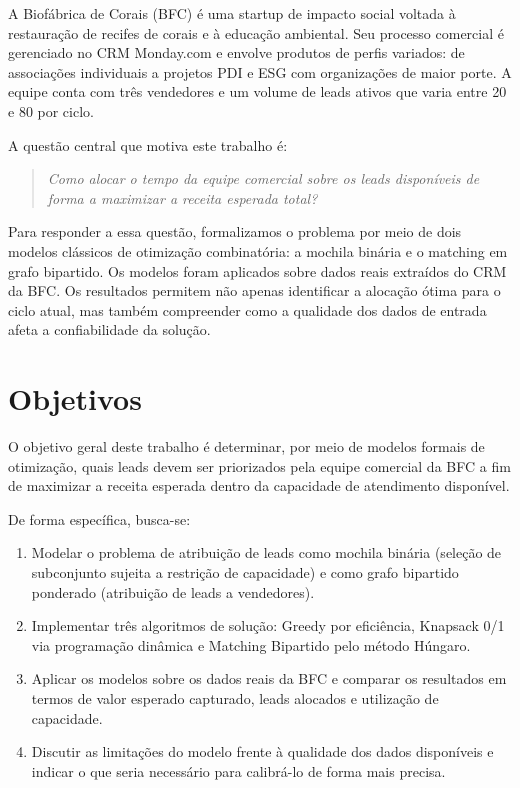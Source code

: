 \documentclass[12pt,a4paper]{article}
\begin{document}
A Biof\'{a}brica de Corais (BFC) \'{e} uma startup de impacto social voltada \`{a} restaura\c{c}\~{a}o
de recifes de corais e \`{a} educa\c{c}\~{a}o ambiental. Seu processo comercial \'{e} gerenciado
no CRM Monday.com e envolve produtos de perfis variados: de associa\c{c}\~{o}es
individuais a projetos PDI e ESG com organiza\c{c}\~{o}es de maior porte. A equipe conta
com tr\^{e}s vendedores e um volume de leads ativos que varia entre 20 e 80 por ciclo.

A quest\~{a}o central que motiva este trabalho \'{e}:

\begin{quote}
\textit{Como alocar o tempo da equipe comercial sobre os leads dispon\'{i}veis de
forma a maximizar a receita esperada total?}
\end{quote}

Para responder a essa quest\~{a}o, formalizamos o problema por meio de dois modelos
cl\'{a}ssicos de otimiza\c{c}\~{a}o combinat\'{o}ria: a mochila bin\'{a}ria e o matching em grafo
bipartido. Os modelos foram aplicados sobre dados reais extra\'{i}dos do CRM da BFC.
Os resultados permitem n\~{a}o apenas identificar a aloca\c{c}\~{a}o \'{o}tima para o ciclo atual,
mas tamb\'{e}m compreender como a qualidade dos dados de entrada afeta a confiabilidade
da solu\c{c}\~{a}o.

\section{Objetivos}

O objetivo geral deste trabalho \'{e} determinar, por meio de modelos formais de
otimiza\c{c}\~{a}o, quais leads devem ser priorizados pela equipe comercial da BFC a
fim de maximizar a receita esperada dentro da capacidade de atendimento dispon\'{i}vel.

De forma espec\'{i}fica, busca-se:

\begin{enumerate}[label=\roman*.]
  \item Modelar o problema de atribui\c{c}\~{a}o de leads como mochila bin\'{a}ria
        (sele\c{c}\~{a}o de subconjunto sujeita a restri\c{c}\~{a}o de capacidade) e como grafo
        bipartido ponderado (atribui\c{c}\~{a}o de leads a vendedores).
  \item Implementar tr\^{e}s algoritmos de solu\c{c}\~{a}o: Greedy por efici\^{e}ncia,
        Knapsack 0/1 via programa\c{c}\~{a}o din\^{a}mica e Matching Bipartido pelo
        m\'{e}todo H\'{u}ngaro.
  \item Aplicar os modelos sobre os dados reais da BFC e comparar os resultados
        em termos de valor esperado capturado, leads alocados e utiliza\c{c}\~{a}o de
        capacidade.
  \item Discutir as limita\c{c}\~{o}es do modelo frente \`{a} qualidade dos dados dispon\'{i}veis
        e indicar o que seria necess\'{a}rio para calibr\'{a}-lo de forma mais precisa.
\end{enumerate}
\end{document}
